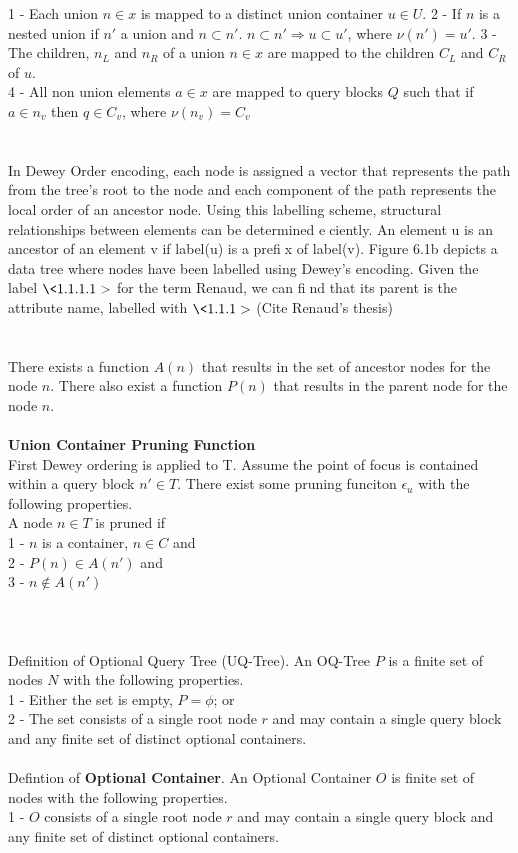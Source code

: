 \documentclass[11pt,onecolumn]{article}
\begin{document}
1 - Each union $n \in x$ is mapped to a distinct union container $u \in U$.  
2 - If $n$ is a nested union if $n'$ a union and $n \subset n'$.  $n \subset n' \Rightarrow u \subset u'$, where $\nu(n') = u'$. 
3 - The children, $n_L$ and $n_R$ of a union $n \in x$ are mapped to the children $C_L$ and $C_R$ of $u$.  \\
4 - All non union elements $a \in x$ are mapped to query blocks $Q$ such that if $a \in n_v $ then $q \in C_v$, where $\nu(n_v) = C_v$\\
\\
\\
In Dewey Order encoding, each node is assigned a vector that represents the path
from the tree's root to the node and each component of the path represents the local
order of an ancestor node. Using this labelling scheme, structural relationships between
elements can be determined eciently. An element u is an ancestor of an element v if
label(u) is a prefix of label(v). Figure 6.1b depicts a data tree where nodes have been
labelled using Dewey's encoding. Given the label $\<1.1.1.1>$ for the term Renaud, we can
find that its parent is the attribute name, labelled with $\<1.1.1>$ (Cite Renaud's thesis)\\
\\
\\
There exists a function $A(n)$ that results in the set of ancestor nodes for the node $n$.  There also exist a function $P(n)$ that results in the parent node for the node $n$.
\\

\\
{\bf Union Container Pruning Function}\\
First Dewey ordering is applied to T.  Assume the point of focus is contained within a query block $n' \in T$.  There exist some pruning funciton $\epsilon_u$ with the following properties.\\
A node $n \in T$ is pruned if  \\
1 - $n$ is a container, $n \in C$ and \\
2 - $P(n) \in A(n')$ and \\
3 - $n \notin A(n')$ \\
\\
\\
\\

Definition of {\bfAbstract Optional Query Tree (UQ-Tree)}.  An OQ-Tree $P$ is a finite set of nodes $N$ with the following properties.\\
1 - Either the set is empty, $P = \phi$; or\\
2 - The set consists of a single root node $r$ and may contain a single query block and any finite set of distinct optional containers. \\
\\
Defintion of  {\bf Optional Container}.  An Optional Container $O$ is finite set of nodes with the following properties.\\
1 - $O$ consists of a single root node $r$ and may contain a single query block and any finite set of distinct optional containers.\\
\\
\end{document}
